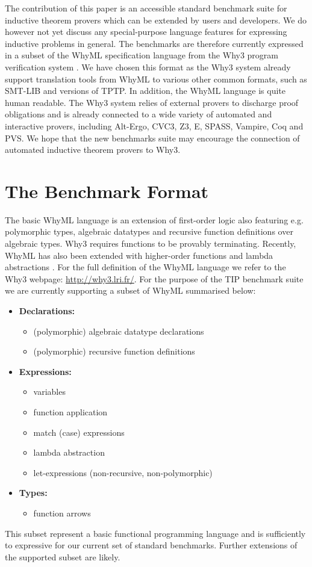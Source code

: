 \documentclass{llncs}
\begin{document}
The contribution of this paper is an accessible standard benchmark suite for inductive theorem provers which can be extended by users and developers. We do however not yet discuss any special-purpose language features for expressing inductive problems in general. The benchmarks are therefore currently expressed in a subset of the WhyML specification language from the Why3 program verification system \cite{boogie11why3,Why3}. We have chosen this format as the Why3 system already support translation tools from WhyML to various other common formats, such as SMT-LIB and versions of TPTP. 
In addition, the WhyML language is quite human readable. The Why3 system relies of external provers to discharge proof obligations and is already connected to a wide variety of automated and interactive provers, including  Alt-Ergo, CVC3, Z3, E, SPASS, Vampire, Coq and PVS. We hope that the new benchmarks suite may encourage the connection of automated inductive theorem provers to Why3. 

\section{The Benchmark Format}
\label{sec:format}
The basic WhyML language is an extension of first-order logic also featuring e.g. polymorphic types, algebraic datatypes and recursive function definitions over algebraic types. Why3 requires functions to be provably terminating. Recently, WhyML has also been extended with higher-order functions and lambda abstractions \cite{HOWhyML}. For the full definition of the WhyML language we refer to the Why3 webpage: \url{http://why3.lri.fr/}. For the purpose of the TIP benchmark suite we are currently supporting a subset of WhyML summarised below:
\begin{itemize}
\item \textbf{Declarations:} 
	\begin{itemize}
	\item (polymorphic) algebraic datatype declarations
	\item (polymorphic) recursive function definitions
	\end{itemize}
\item \textbf{Expressions:} 
	\begin{itemize}
	\item variables
	\item function application
	\item match (case) expressions
	\item lambda abstraction
	\item let-expressions (non-recursive, non-polymorphic)
	\end{itemize}
\item \textbf{Types:}
	\begin{itemize}
	\item function arrows
	\end{itemize}
\end{itemize}	
This subset represent a basic functional programming language and is sufficiently to expressive for our current set of standard benchmarks. Further extensions of the supported subset are likely. 
\end{document}
